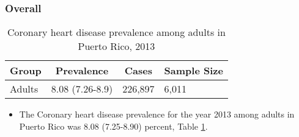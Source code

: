 
\subsubsection{Overall}




\begin{table}[H]
\caption{Coronary heart disease prevalence among adults in Puerto Rico, 2013\label{tab:Overall.tabl.Coronary_Heart_Disease.2013}} 
\begin{center}
\begin{tabular}{llll}
\hline\hline
\multicolumn{1}{l}{Group}&\multicolumn{1}{c}{Prevalence}&\multicolumn{1}{c}{Cases}&\multicolumn{1}{c}{Sample Size}\tabularnewline
\hline
Adults&8.08 (7.26-8.9)&226,897&6,011\tabularnewline
\hline
\end{tabular}\end{center}

\end{table}




\begin{itemize}


\item The Coronary heart disease prevalence for the year 2013 among adults in Puerto Rico was 8.08 (7.25-8.90) percent, 
Table \ref{tab:Overall.tabl.Coronary_Heart_Disease.2013}.

\end{itemize}


